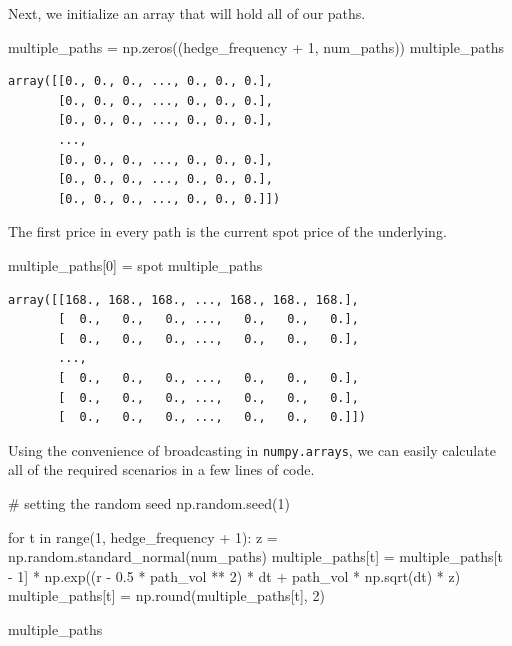\documentclass[
  letterpaper,
  DIV=11,
  numbers=noendperiod]{scrreprt}
\newenvironment{Shaded}{\begin{snugshade}}{\end{snugshade}}
\newcommand{\BuiltInTok}[1]{\textcolor[rgb]{0.00,0.23,0.31}{#1}}
\newcommand{\CommentTok}[1]{\textcolor[rgb]{0.37,0.37,0.37}{#1}}
\newcommand{\ControlFlowTok}[1]{\textcolor[rgb]{0.00,0.23,0.31}{#1}}
\newcommand{\DecValTok}[1]{\textcolor[rgb]{0.68,0.00,0.00}{#1}}
\newcommand{\FloatTok}[1]{\textcolor[rgb]{0.68,0.00,0.00}{#1}}
\newcommand{\KeywordTok}[1]{\textcolor[rgb]{0.00,0.23,0.31}{#1}}
\newcommand{\NormalTok}[1]{\textcolor[rgb]{0.00,0.23,0.31}{#1}}
\newcommand{\OperatorTok}[1]{\textcolor[rgb]{0.37,0.37,0.37}{#1}}
\begin{document}
Next, we initialize an array that will hold all of our paths.

\begin{Shaded}
\begin{Highlighting}[]
\NormalTok{multiple\_paths }\OperatorTok{=}\NormalTok{ np.zeros((hedge\_frequency }\OperatorTok{+} \DecValTok{1}\NormalTok{, num\_paths))}
\NormalTok{multiple\_paths}
\end{Highlighting}
\end{Shaded}

\begin{verbatim}
array([[0., 0., 0., ..., 0., 0., 0.],
       [0., 0., 0., ..., 0., 0., 0.],
       [0., 0., 0., ..., 0., 0., 0.],
       ...,
       [0., 0., 0., ..., 0., 0., 0.],
       [0., 0., 0., ..., 0., 0., 0.],
       [0., 0., 0., ..., 0., 0., 0.]])
\end{verbatim}

The first price in every path is the current spot price of the
underlying.

\begin{Shaded}
\begin{Highlighting}[]
\NormalTok{multiple\_paths[}\DecValTok{0}\NormalTok{] }\OperatorTok{=}\NormalTok{ spot}
\NormalTok{multiple\_paths}
\end{Highlighting}
\end{Shaded}

\begin{verbatim}
array([[168., 168., 168., ..., 168., 168., 168.],
       [  0.,   0.,   0., ...,   0.,   0.,   0.],
       [  0.,   0.,   0., ...,   0.,   0.,   0.],
       ...,
       [  0.,   0.,   0., ...,   0.,   0.,   0.],
       [  0.,   0.,   0., ...,   0.,   0.,   0.],
       [  0.,   0.,   0., ...,   0.,   0.,   0.]])
\end{verbatim}

Using the convenience of broadcasting in \texttt{numpy.arrays}, we can
easily calculate all of the required scenarios in a few lines of code.

\begin{Shaded}
\begin{Highlighting}[]
\CommentTok{\# setting the random seed}
\NormalTok{np.random.seed(}\DecValTok{1}\NormalTok{)}

\ControlFlowTok{for}\NormalTok{ t }\KeywordTok{in} \BuiltInTok{range}\NormalTok{(}\DecValTok{1}\NormalTok{, hedge\_frequency }\OperatorTok{+} \DecValTok{1}\NormalTok{):}
\NormalTok{    z }\OperatorTok{=}\NormalTok{ np.random.standard\_normal(num\_paths) }
\NormalTok{    multiple\_paths[t] }\OperatorTok{=}\NormalTok{ multiple\_paths[t }\OperatorTok{{-}} \DecValTok{1}\NormalTok{] }\OperatorTok{*}\NormalTok{ np.exp((r }\OperatorTok{{-}} \FloatTok{0.5} \OperatorTok{*}\NormalTok{ path\_vol }\OperatorTok{**} \DecValTok{2}\NormalTok{) }\OperatorTok{*}\NormalTok{ dt }\OperatorTok{+}\NormalTok{ path\_vol }\OperatorTok{*}\NormalTok{ np.sqrt(dt) }\OperatorTok{*}\NormalTok{ z)}
\NormalTok{    multiple\_paths[t] }\OperatorTok{=}\NormalTok{ np.}\BuiltInTok{round}\NormalTok{(multiple\_paths[t], }\DecValTok{2}\NormalTok{)}
    
\NormalTok{multiple\_paths}
\end{Highlighting}
\end{Shaded}
\end{document}
